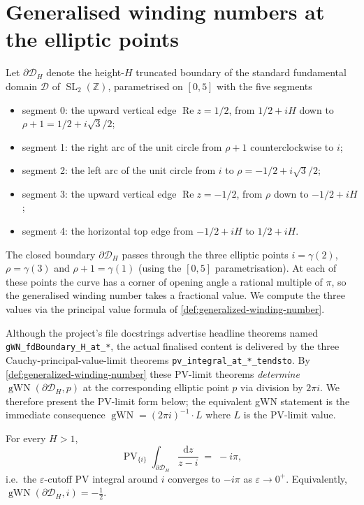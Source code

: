 \section{Generalised winding numbers at the elliptic points}\label{sec:winding-elliptic}

Let $\partial \mathcal{D}_H$ denote the height-$H$ truncated boundary
of the standard fundamental domain $\mathcal{D}$ of
$\operatorname{SL}_2(\mathbb{Z})$, parametrised on $[0,5]$ with the
five segments
\begin{itemize}
  \item segment 0: the upward vertical edge $\operatorname{Re} z = 1/2$,
    from $1/2 + iH$ down to $\rho + 1 = 1/2 + i\sqrt{3}/2$;
  \item segment 1: the right arc of the unit circle from
    $\rho + 1$ counterclockwise to $i$;
  \item segment 2: the left arc of the unit circle from $i$ to
    $\rho = -1/2 + i\sqrt{3}/2$;
  \item segment 3: the upward vertical edge $\operatorname{Re} z = -1/2$,
    from $\rho$ down to $-1/2 + iH$;
  \item segment 4: the horizontal top edge from $-1/2 + iH$ to
    $1/2 + iH$.
\end{itemize}
The closed boundary $\partial \mathcal{D}_H$ passes through the three
elliptic points $i = \gamma(2)$, $\rho = \gamma(3)$ and
$\rho + 1 = \gamma(1)$ (using the $[0,5]$ parametrisation). At each
of these points the curve has a corner of opening angle a rational
multiple of $\pi$, so the generalised winding number takes a
fractional value. We compute the three values via the principal value
formula of \cref{def:generalized-winding-number}.

\medskip\noindent
Although the project's file docstrings advertise headline theorems
named \texttt{gWN\_fdBoundary\_H\_at\_*}, the actual finalised
content is delivered by the three Cauchy-principal-value-limit
theorems \texttt{pv\_integral\_at\_*\_tendsto}. By
\cref{def:generalized-winding-number} these PV-limit theorems
\emph{determine} $\operatorname{gWN}(\partial \mathcal{D}_H, p)$ at
the corresponding elliptic point $p$ via division by $2\pi i$. We
therefore present the PV-limit form below; the equivalent gWN
statement is the immediate consequence
$\operatorname{gWN} = (2 \pi i)^{-1} \cdot L$ where $L$ is the
PV-limit value.

\begin{theorem}
  \label{thm:gwn-at-i}
  \leanok
  For every $H > 1$,
  \[
    \operatorname{PV}_{\{i\}}\!\!\int_{\partial \mathcal{D}_H}
      \frac{\mathrm{d}z}{z - i}
    \;=\; -i\pi,
  \]
  i.e.\ the $\varepsilon$-cutoff PV integral around $i$ converges to
  $-i\pi$ as $\varepsilon \to 0^{+}$. Equivalently,
  $\operatorname{gWN}(\partial \mathcal{D}_H, i) = -\tfrac{1}{2}$.
\end{theorem}

